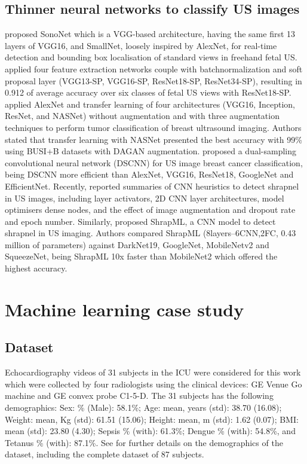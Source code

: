 \documentclass[mlabstract,twocolumn]{jmlr}
\begin{document}
\subsection{Thinner neural networks to classify US images} \label{subsec:thinnerNets}
\citet{baumgartner2017-IEEETransMedImag} proposed SonoNet which is a VGG-based architecture, having the same first 13 layers of VGG16, and SmallNet, loosely inspired by AlexNet, for real-time detection and bounding box localisation of standard views in freehand fetal US.
\citet{toussaint2018-MICCAI} applied four feature extraction networks couple with batchnormalization and soft proposal layer (VGG13-SP, VGG16-SP, ResNet18-SP, ResNet34-SP), resulting in 0.912 of average accuracy over six classes of fetal US views with ResNet18-SP.
\citet{Al-Dhabyani2019-IJACSA} applied AlexNet and transfer learning of four architectures (VGG16, Inception, ResNet, and NASNet) without augmentation and with three augmentation techniques to perform tumor classification of breast ultrasound imaging.
Authors stated that transfer learning with NASNet presented the best accuracy with 99\% using BUSI+B datasets with DAGAN augmentation.
\citet{xie2020-physics-in-medicine-biology} proposed a dual-sampling convolutional neural network (DSCNN) for US image breast cancer classification, being DSCNN more efficient than AlexNet, VGG16, ResNet18, GoogleNet and EfficientNet.
Recently, \citet{snider2022-ScientificReports} reported summaries of CNN heuristics to detect shrapnel in US images, including layer activators, 2D CNN layer architectures, model optimisers dense nodes, and the effect of image augmentation and dropout rate and epoch number.
Similarly, \citet{boice2022-in-jimaging} proposed ShrapML, a CNN model to detect shrapnel in US imaging.
Authors compared ShrapML (8layers--6CNN,2FC, 0.43 million of parameters) against DarkNet19, GoogleNet, MobileNetv2 and SqueezeNet, being ShrapML 10x faster than MobileNet2 which offered the highest accuracy.

\section{Machine learning case study}

\subsection{Dataset}
Echocardiography videos of 31 subjects in the ICU were considered for this work which were collected by four radiologists using the clinical devices: GE Venue Go machine and GE convex probe C1-5-D.
The 31 subjects has the following demographics:
Sex: \% (Male): 58.1\%;
Age: mean, years (std): 38.70 (16.08);
Weight: mean, Kg (std): 61.51 (15.06);
Height: mean, m (std): 1.62 (0.07);
BMI: mean (std): 23.80 (4.30);
Sepsis \% (with): 61.3\%;
Dengue \% (with): 54.8\%, and
Tetanus \% (with): 87.1\%.
See  for further details on the demographics of the dataset, including the complete dataset of 87 subjects.
\end{document}

